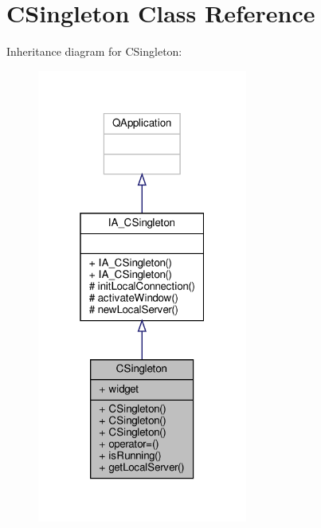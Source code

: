 \hypertarget{classCSingleton}{}\section{C\+Singleton Class Reference}
\label{classCSingleton}


Inheritance diagram for C\+Singleton\+:
\nopagebreak
\begin{figure}[H]
\begin{center}
\leavevmode
\includegraphics[width=196pt]{classCSingleton__inherit__graph}
\end{center}
\end{figure}


